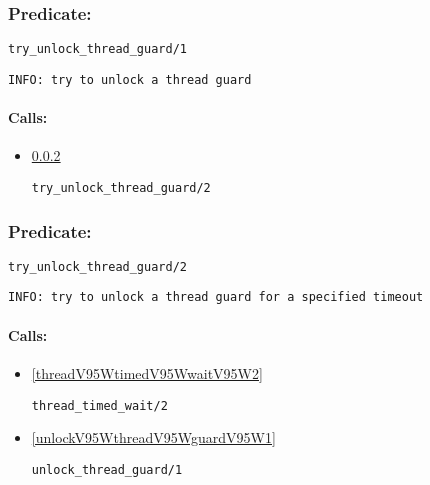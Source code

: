 \subsubsection{Predicate:} \label{tryV95WunlockV95WthreadV95WguardV95W1}

\begin{verbatim}
try_unlock_thread_guard/1
\end{verbatim}

{\small \begin{verbatim}
INFO: try to unlock a thread guard

\end{verbatim}}
\paragraph{Calls:} 
\begin{itemize}
\item \ref{tryV95WunlockV95WthreadV95WguardV95W2} 
\begin{verbatim}
try_unlock_thread_guard/2
\end{verbatim}

\end{itemize}

\subsubsection{Predicate:} \label{tryV95WunlockV95WthreadV95WguardV95W2}

\begin{verbatim}
try_unlock_thread_guard/2
\end{verbatim}

{\small \begin{verbatim}
INFO: try to unlock a thread guard for a specified timeout

\end{verbatim}}
\paragraph{Calls:} 
\begin{itemize}
\item \ref{threadV95WtimedV95WwaitV95W2} 
\begin{verbatim}
thread_timed_wait/2
\end{verbatim}

\item \ref{unlockV95WthreadV95WguardV95W1} 
\begin{verbatim}
unlock_thread_guard/1
\end{verbatim}

\end{itemize}
